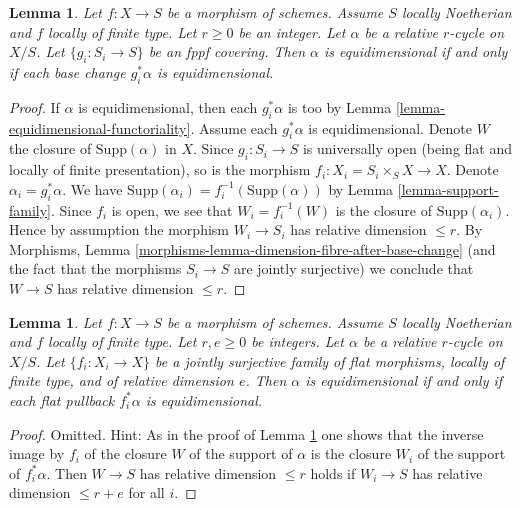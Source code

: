 \documentclass{stacks-project}
\theoremstyle{plain}
\newtheorem{lemma}[subsection]{Lemma}
\theoremstyle{definition}
\theoremstyle{remark}
\numberwithin{equation}{subsection}
\begin{document}
\begin{lemma}
\label{lemma-equidimensional-fppf-descent}
Let $f : X \to S$ be a morphism of schemes. Assume $S$ locally Noetherian
and $f$ locally of finite type. Let $r \geq 0$ be an integer. Let $\alpha$
be a relative $r$-cycle on $X/S$. Let $\{g_i : S_i \to S\}$
be an fppf covering. Then $\alpha$ is equidimensional
if and only if each base change $g_i^*\alpha$ is equidimensional.
\end{lemma}

\begin{proof}
If $\alpha$ is equidimensional, then each $g_i^*\alpha$ is too by
Lemma \ref{lemma-equidimensional-functoriality}. Assume each $g_i^*\alpha$
is equidimensional. Denote $W$ the closure
of $\text{Supp}(\alpha)$ in $X$. Since $g_i : S_i \to S$ is universally open
(being flat and locally of finite presentation), so is the morphism
$f_i : X_i = S_i \times_S X \to X$. Denote $\alpha_i = g_i^*\alpha$. We have
$\text{Supp}(\alpha_i) = f_i^{-1}(\text{Supp}(\alpha))$ by
Lemma \ref{lemma-support-family}.
Since $f_i$ is open, we see that $W_i = f_i^{-1}(W)$ is the closure
of $\text{Supp}(\alpha_i)$. Hence by assumption the morphism
$W_i \to S_i$ has relative dimension $\leq r$.
By Morphisms, Lemma \ref{morphisms-lemma-dimension-fibre-after-base-change}
(and the fact that the morphisms $S_i \to S$ are jointly surjective)
we conclude that $W \to S$ has relative dimension $\leq r$.
\end{proof}

\begin{lemma}
\label{lemma-equidimensional-descent-pullbacks}
Let $f : X \to S$ be a morphism of schemes. Assume $S$ locally Noetherian
and $f$ locally of finite type. Let $r, e \geq 0$ be integers.
Let $\alpha$ be a relative $r$-cycle on $X/S$.
Let $\{f_i : X_i \to X\}$ be a jointly surjective family
of flat morphisms, locally of finite type, and of relative dimension $e$.
Then $\alpha$ is equidimensional if and only if each flat
pullback $f_i^*\alpha$ is equidimensional.
\end{lemma}

\begin{proof}
Omitted. Hint: As in the proof of Lemma \ref{lemma-equidimensional-fppf-descent}
one shows that the inverse image by $f_i$ of the closure $W$ of the support of
$\alpha$ is the closure $W_i$ of the support of $f_i^*\alpha$. Then
$W \to S$ has relative dimension $\leq r$ holds if $W_i \to S$
has relative dimension $\leq r + e$ for all $i$.
\end{proof}
\end{document}
